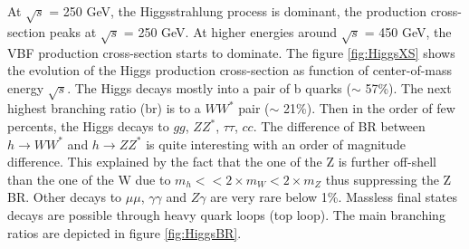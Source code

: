 At $\sqrt{s}$ = 250 GeV, the Higgsstrahlung process is dominant, the production cross-section peaks at $\sqrt{s}$ = 250 GeV. At higher energies around $\sqrt{s}$ = 450 GeV, the VBF production cross-section starts to dominate. The figure \ref{fig:HiggsXS} shows the evolution of the Higgs production cross-section as function of center-of-mass energy $\sqrt{s}$.
The Higgs decays mostly into a pair of b quarks ($\sim$ 57\%). The next highest branching ratio (\acrshort{br}) is to a $WW^*$ pair ($\sim$ 21\%). Then in the order of few percents, the Higgs decays to $gg$, $ZZ^*$, $\tau \tau$, $cc$. The difference of BR between $h \rightarrow WW^*$ and $h \rightarrow ZZ^*$ is quite interesting with an order of magnitude difference. This explained by the fact that the one of the Z is further off-shell than the one of the W due to $m_h << 2 \times m_W < 2 \times m_Z$ thus suppressing the Z BR.
Other decays to $\mu \mu$, $\gamma \gamma$ and $Z\gamma$ are very rare below 1\%. Massless final states decays are possible through heavy quark loops (top loop). The main branching ratios are depicted in figure \ref{fig:HiggsBR}.

